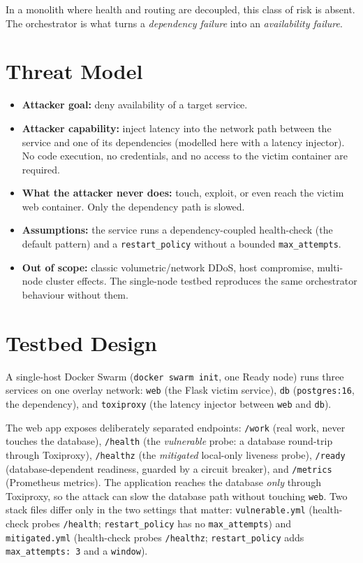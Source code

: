 \documentclass[11pt]{article}
\begin{document}
In a monolith where health and routing are decoupled, this class of risk is
absent. The orchestrator is what turns a \emph{dependency failure} into an
\emph{availability failure}.

\section{Threat Model}

\begin{itemize}[nosep]
\item \textbf{Attacker goal:} deny availability of a target service.
\item \textbf{Attacker capability:} inject latency into the network path between
  the service and one of its dependencies (modelled here with a latency
  injector). No code execution, no credentials, and no access to the victim
  container are required.
\item \textbf{What the attacker never does:} touch, exploit, or even reach the
  victim web container. Only the dependency path is slowed.
\item \textbf{Assumptions:} the service runs a dependency-coupled health-check
  (the default pattern) and a \texttt{restart\_policy} without a bounded
  \texttt{max\_attempts}.
\item \textbf{Out of scope:} classic volumetric/network DDoS, host compromise,
  multi-node cluster effects. The single-node testbed reproduces the same
  orchestrator behaviour without them.
\end{itemize}

\section{Testbed Design}

A single-host Docker Swarm (\texttt{docker swarm init}, one Ready node) runs
three services on one overlay network: \texttt{web} (the Flask victim service),
\texttt{db} (\texttt{postgres:16}, the dependency), and \texttt{toxiproxy}
(the latency injector between \texttt{web} and \texttt{db}).

The web app exposes deliberately separated endpoints: \texttt{/work} (real work,
never touches the database), \texttt{/health} (the \emph{vulnerable} probe: a
database round-trip through Toxiproxy), \texttt{/healthz} (the \emph{mitigated}
local-only liveness probe), \texttt{/ready} (database-dependent readiness,
guarded by a circuit breaker), and \texttt{/metrics} (Prometheus metrics). The
application reaches the database \emph{only} through Toxiproxy, so the attack can
slow the database path without touching \texttt{web}. Two stack files differ
only in the two settings that matter: \texttt{vulnerable.yml} (health-check
probes \texttt{/health}; \texttt{restart\_policy} has no \texttt{max\_attempts})
and \texttt{mitigated.yml} (health-check probes \texttt{/healthz};
\texttt{restart\_policy} adds \texttt{max\_attempts: 3} and a \texttt{window}).
\end{document}
